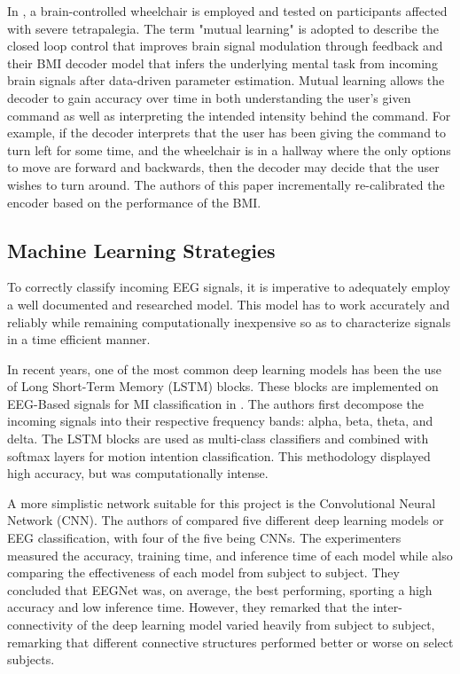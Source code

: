 \documentclass[conference]{IEEEtran}
\begin{document}
    In \cite{learning_to_control}, a brain-controlled wheelchair is employed and tested on participants affected with severe tetrapalegia. The term "mutual learning" is adopted to describe the closed loop control that improves brain signal modulation through feedback and their BMI decoder model that infers the underlying mental task from incoming brain signals after data-driven parameter estimation. Mutual learning allows the decoder to gain accuracy over time in both understanding the user's given command as well as interpreting the intended intensity behind the command. For example, if the decoder interprets that the user has been giving the command to turn left for some time, and the wheelchair is in a hallway where the only options to move are forward and backwards, then the decoder may decide that the user wishes to turn around. The authors of this paper incrementally re-calibrated the encoder based on the performance of the BMI. 

    \subsection{Machine Learning Strategies}
    To correctly classify incoming EEG signals, it is imperative to adequately employ a well documented and researched model. This model has to work accurately and reliably while remaining computationally inexpensive so as to characterize signals in a time efficient manner.  

    In recent years, one of the most common deep learning models has been the use of Long Short-Term Memory (LSTM) blocks. These blocks are implemented on EEG-Based signals for MI classification in \cite{lstm_eeg}. The authors first decompose the incoming signals into their respective frequency bands: alpha, beta, theta, and delta. The LSTM blocks are used as multi-class classifiers and combined with softmax layers for motion intention classification. This methodology displayed high accuracy, but was computationally intense. 

    A more simplistic network suitable for this project is the Convolutional Neural Network (CNN). The authors of \cite{deep_learning_eeg} compared five different deep learning models or EEG classification, with four of the five being CNNs. The experimenters measured the accuracy, training time, and inference time of each model while also comparing the effectiveness of each model from subject to subject. They concluded that EEGNet was, on average, the best performing, sporting a high accuracy and low inference time. However, they remarked that the inter-connectivity of the deep learning model varied heavily from subject to subject, remarking that different connective structures performed better or worse on select subjects. 
\end{document}
